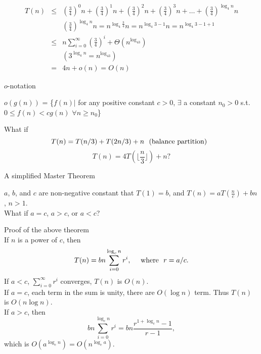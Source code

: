 \documentclass{beamer}
\begin{document}
\begin{frame}{}
\begin{eqnarray*}
T(n) &\le& {(\frac{3}{4})}^0n + {(\frac{3}{4})}^1n + {(\frac{3}{4})}^2n+
  {(\frac{3}{4})}^3n + \ldots + {(\frac{3}{4})}^{\log_4n}n\\
   & &{(\frac{3}{4})}^{\log_4n}n=n^{\log_4{\frac{3}{4}}}n=n^{\log_4 3-1}n=n^{\log_4 3-1+1}\\
   &\le& n\sum_{i=0}^\infty {(\frac{3}{4})}^i + \Theta(n^{\log_43}) \\
   &   &       (3^{\log_4n}=n^{\log_43})\\
   & = &4n+o(n) = O(n)
\end{eqnarray*}
\end{frame}

\begin{frame}{}
\begin{center}
$o$-notation
\end{center}
$o(g(n))$ = \{$f(n)|$ for any positive constant $c>0$, $\exists$ a constant
 $n_0>0$ s.t. $0\le f(n)<cg(n)$ $\forall n\ge n_0$\}
\end{frame}

\begin{frame}{}
What if $$T(n)=T(n/3)+T(2n/3)+n {\rm \ \ (balance\ partition)\ \ } $$
$$T(n)=4T(\lfloor \frac{n}{3} \rfloor)+n?$$
\end{frame}

\begin{frame}{}
\begin{center}
{\large A simplified Master Theorem}
\end{center}
$a$, $b$, and $c$ are non-negative constant that
$T(1) = b$, and $T(n) = aT(\frac{n}{c})+bn$, $n>1$.\\
What if $a=c$, $a>c$, or $a<c$?
\end{frame}

\begin{frame}{}
Proof of the above theorem\\
If $n$ is a power of $c$, then
$$T(n)=bn\sum_{i=0}^{\log_c n}r^i,\ \ \ \ {\rm where\ \ } r=a/c.$$
If $a<c$, $\sum_{i=0}^{\infty}r^i$ converges, $T(n)$ is $O(n)$. \\
If $a=c$, each term in the sum is unity, there are $O(\log n)$ term. Thus $T(n)$ is $O(n\log n)$. \\
If $a>c$, then $$bn\sum_{i=0}^{\log_c n} r^i=bn\frac{r^{1+\log_c n}-1}{r-1},$$ which
 is $O(a^{\log_c n})=O(n^{\log_c a})$.  
\end{frame}
\end{document}
